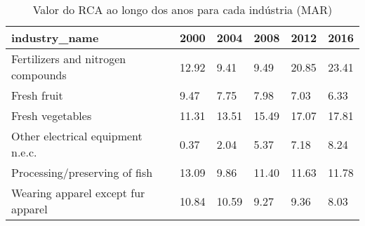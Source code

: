 \begin{table}
\centering
\caption{Valor do RCA ao longo dos anos para cada indústria (MAR)}
\begin{tabular}{p{6cm}p{1.5cm}p{1.5cm}p{1.5cm}p{1.5cm}p{1.5cm}}
\toprule
                     industry\_name &  2000 &  2004 &  2008 &  2012 &  2016 \\
\midrule
Fertilizers and nitrogen compounds & 12.92 &  9.41 &  9.49 & 20.85 & 23.41 \\
                       Fresh fruit &  9.47 &  7.75 &  7.98 &  7.03 &  6.33 \\
                  Fresh vegetables & 11.31 & 13.51 & 15.49 & 17.07 & 17.81 \\
 Other electrical equipment n.e.c. &  0.37 &  2.04 &  5.37 &  7.18 &  8.24 \\
     Processing/preserving of fish & 13.09 &  9.86 & 11.40 & 11.63 & 11.78 \\
Wearing apparel except fur apparel & 10.84 & 10.59 &  9.27 &  9.36 &  8.03 \\
\bottomrule
\end{tabular}
\end{table}
